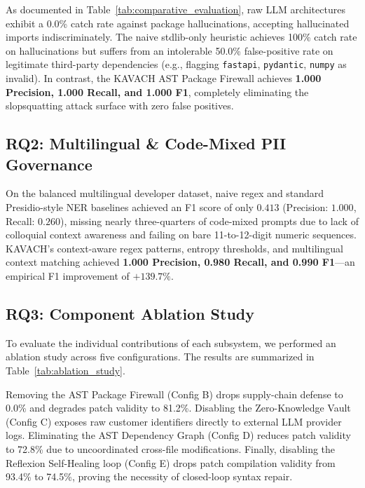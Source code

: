 \documentclass[conference]{IEEEtran}
\begin{document}


As documented in Table~\ref{tab:comparative_evaluation}, raw LLM architectures exhibit a 0.0\% catch rate against package hallucinations, accepting hallucinated imports indiscriminately. The naive stdlib-only heuristic achieves 100\% catch rate on hallucinations but suffers from an intolerable 50.0\% false-positive rate on legitimate third-party dependencies (e.g., flagging \texttt{fastapi}, \texttt{pydantic}, \texttt{numpy} as invalid). In contrast, the KAVACH AST Package Firewall achieves \textbf{1.000 Precision, 1.000 Recall, and 1.000 F1}, completely eliminating the slopsquatting attack surface with zero false positives.

\subsection{RQ2: Multilingual \& Code-Mixed PII Governance}
On the balanced multilingual developer dataset, naive regex and standard Presidio-style NER baselines achieved an F1 score of only $0.413$ (Precision: $1.000$, Recall: $0.260$), missing nearly three-quarters of code-mixed prompts due to lack of colloquial context awareness and failing on bare 11-to-12-digit numeric sequences. KAVACH’s context-aware regex patterns, entropy thresholds, and multilingual context matching achieved \textbf{1.000 Precision, 0.980 Recall, and 0.990 F1}—an empirical F1 improvement of \textbf{$+139.7\%$}.

\subsection{RQ3: Component Ablation Study}
To evaluate the individual contributions of each subsystem, we performed an ablation study across five configurations. The results are summarized in Table~\ref{tab:ablation_study}.



Removing the AST Package Firewall (Config B) drops supply-chain defense to 0.0\% and degrades patch validity to 81.2\%. Disabling the Zero-Knowledge Vault (Config C) exposes raw customer identifiers directly to external LLM provider logs. Eliminating the AST Dependency Graph (Config D) reduces patch validity to 72.8\% due to uncoordinated cross-file modifications. Finally, disabling the Reflexion Self-Healing loop (Config E) drops patch compilation validity from 93.4\% to 74.5\%, proving the necessity of closed-loop syntax repair.
\end{document}
